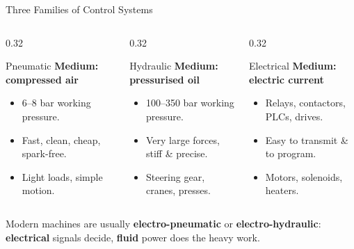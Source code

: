 \documentclass[aspectratio=169]{beamer}
\begin{document}
	\begin{frame}{Three Families of Control Systems}
		\begin{columns}[T]
			\begin{column}{0.32\textwidth}
				\begin{block}{Pneumatic}
					\centering
					\textbf{Medium: compressed air}

					\vspace{0.2cm}

					\begin{itemize}\small
						\item 6--8 bar working pressure.
						\item Fast, clean, cheap, spark-free.
						\item Light loads, simple motion.
					\end{itemize}
				\end{block}
			\end{column}
			\begin{column}{0.32\textwidth}
				\begin{block}{Hydraulic}
					\centering
					\textbf{Medium: pressurised oil}

					\vspace{0.2cm}

					\begin{itemize}\small
						\item 100--350 bar working pressure.
						\item Very large forces, stiff \& precise.
						\item Steering gear, cranes, presses.
					\end{itemize}
				\end{block}
			\end{column}
			\begin{column}{0.32\textwidth}
				\begin{block}{Electrical}
					\centering
					\textbf{Medium: electric current}

					\vspace{0.2cm}

					\begin{itemize}\small
						\item Relays, contactors, PLCs, drives.
						\item Easy to transmit \& to program.
						\item Motors, solenoids, heaters.
					\end{itemize}
				\end{block}
			\end{column}
		\end{columns}
		\vspace{0.35cm}
		\begin{center}
			\small
			Modern machines are usually \textbf{electro-pneumatic} or \textbf{electro-hydraulic}:\\
			\textbf{electrical} signals decide, \textbf{fluid} power does the heavy work.
		\end{center}
	\end{frame}
\end{document}
